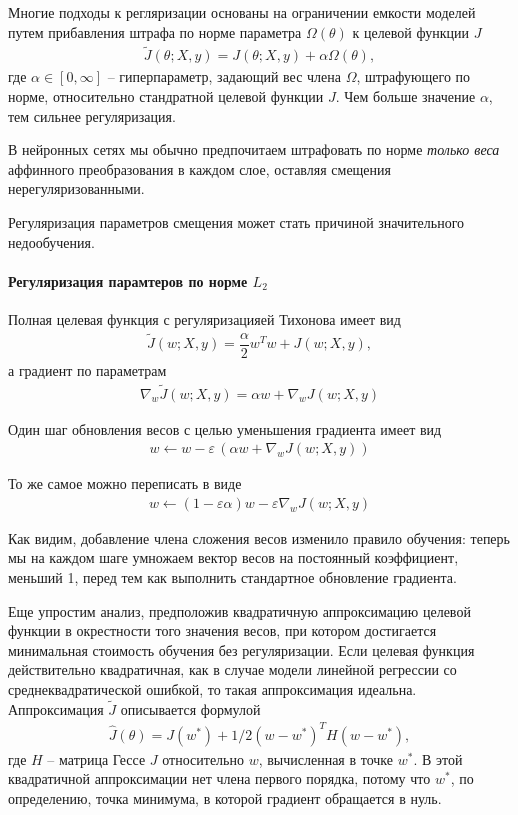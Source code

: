 \documentclass[%
	11pt,
	a4paper,
	utf8,
]{article}
\begin{document}
Многие подходы к регляризации основаны на ограничении емкости моделей путем прибавления  штрафа по норме параметра $ \Omega(\theta) $ к целевой функции $ J $
\begin{align*}
	\tilde{J}(\theta; X, y) = J(\theta; X, y) + \alpha \Omega(\theta),
\end{align*}
где $ \alpha \in [0, \infty] $ -- гиперпараметр, задающий вес члена $ \Omega $, штрафующего по норме, относительно стандратной целевой функции $ J $. Чем больше значение $ \alpha $, тем сильнее регуляризация.

В нейронных сетях мы обычно предпочитаем штрафовать по норме \emph{только веса} аффинного преобразования в каждом слое, оставляя смещения нерегуляризованными.

Регуляризация параметров смещения может стать причиной значительного недообучения. 

\paragraph{Регуляризация парамтеров по норме $ L_2 $}

Полная целевая функция с регуляризацияей Тихонова имеет вид
\begin{align*}
	\tilde{J}(w; X, y) = \dfrac{\alpha}{2} w^T w + J(w; X, y),
\end{align*}
а градиент по параметрам 
\begin{align*}
	\nabla_w \tilde{J}(w; X, y) = \alpha w + \nabla_w J(w; X, y)
\end{align*}

Один шаг обновления весов с целью уменьшения градиента имеет вид
\begin{align*}
	w \leftarrow w - \varepsilon \, (\alpha w + \nabla_w J(w; X, y))
\end{align*}

То же самое можно переписать в виде
\begin{align*}
	w \leftarrow (1 - \varepsilon \alpha) w - \varepsilon \nabla_w J(w; X, y)
\end{align*}

Как видим, добавление члена сложения весов изменило правило обучения: теперь мы на каждом шаге умножаем вектор весов на постоянный коэффициент, меньший 1, перед тем как выполнить стандартное обновление градиента. 

Еще упростим анализ, предположив квадратичную аппроксимацию целевой функции в окрестности того значения весов, при котором достигается минимальная стоимость обучения без регуляризации. Если целевая функция действительно квадратичная, как в случае модели линейной регрессии со среднеквадратической ошибкой, то такая аппроксимация идеальна. Аппроксимация $ \tilde{J} $ описывается формулой
\begin{align*}
	\hat{J}(\theta) = J(w^*) + 1/2 (w - w^*)^T H(w - w^*),
\end{align*}
где $ H $ -- матрица Гессе $ J $ относительно $ w $, вычисленная в точке $ w^* $. В этой квадратичной аппроксимации нет члена первого порядка, потому что $ w^* $, по определению, точка минимума, в которой градиент обращается в нуль. 
\end{document}
